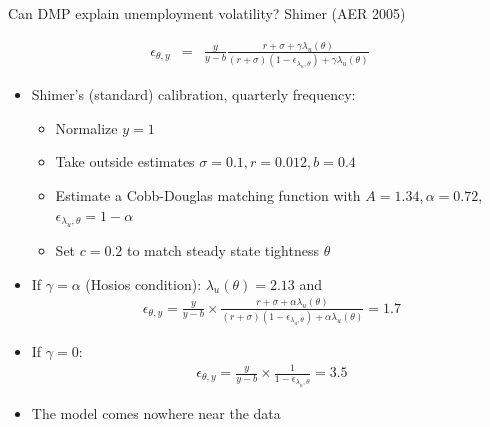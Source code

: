 \documentclass[9pt]{beamer}
\newcommand{\bit}{\begin{itemize}}
\newcommand{\eit}{\end{itemize}}
\begin{document}
\begin{frame}{Can DMP explain unemployment volatility? Shimer (AER 2005)}

\begin{eqnarray}
\epsilon_{\theta, y} &=& \frac{y}{y-b} \frac{r+ \sigma + \gamma \lambda_u(\theta)}{(r + \sigma)(1-\epsilon_{\lambda_u,\theta}) + \gamma \lambda_u(\theta)} \nonumber
\end{eqnarray}

\bit
\setlength\itemsep{1.5em}

\item Shimer's (standard) calibration, quarterly frequency: 
\bit
\item Normalize $y=1$
\item Take outside estimates $\sigma = 0.1, r = 0.012, b=0.4$
\item Estimate a Cobb-Douglas matching function with $A=1.34, \alpha = 0.72$, $\epsilon_{\lambda_u,\theta} = 1-\alpha$
\item Set $c = 0.2$	to match steady state tightness $\theta$
\eit

\item If $\gamma=\alpha$ (Hosios condition): $\lambda_u(\theta) = 2.13$ and
\begin{eqnarray}
\epsilon_{\theta, y} = \frac{y}{y-b} \times  \frac{r+ \sigma + \alpha \lambda_u(\theta)}{(r + \sigma)(1-\epsilon_{\lambda_u,\theta}) + \alpha \lambda_u(\theta)}  = 1.7  \nonumber
\end{eqnarray}


\item If $\gamma=0$:
\begin{eqnarray}
\epsilon_{\theta, y} = \frac{y}{y-b} \times \frac{1}{1-\epsilon_{\lambda_u,\theta}} = 3.5  \nonumber
\end{eqnarray}


\item The model comes nowhere near the data

\eit
\end{frame}
\end{document}
